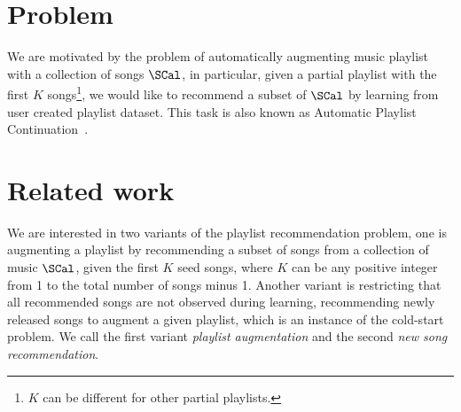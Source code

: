 %
% 
%
%
%

\section{Problem}

We are motivated by the problem of automatically augmenting music playlist with a collection of songs $\SCal$,
in particular, given a partial playlist with the first $K$ songs\footnote{$K$ can be different for other partial playlists.},
we would like to recommend a subset of $\SCal$ by learning from user created playlist dataset.
This task is also known as Automatic Playlist Continuation~\cite{schedl2017,recsysch2018}.


\section{Related work}

We are interested in two variants of the playlist recommendation problem,
one is augmenting a playlist by recommending a subset of songs from a collection of music $\SCal$,
given the first $K$ seed songs, where $K$ can be any positive integer from 1 to the total number of songs minus 1.
Another variant is restricting that all recommended songs are not observed during learning,
\ie recommending newly released songs to augment a given playlist, which is an instance of the cold-start problem.
We call the first variant \emph{playlist augmentation} and the second \emph{new song recommendation}.


